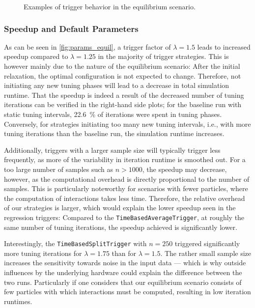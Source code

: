 \begin{figure}[htpb]
\begin{subfigure}[t]{0.5\textwidth}
		\vspace*{-1cm}
	\end{subfigure}
	\caption{Examples of trigger behavior in the equilibrium scenario.}
	\label{fig:equilibrium_trigger_behavior}
\end{figure}



\subsubsection{Speedup and Default Parameters}

As can be seen in \autoref{fig:params_equil}, a trigger factor of $\lambda=1.5$ leads to increased speedup compared to $\lambda=1.25$ in the majority of trigger strategies. This is however mainly due to the nature of the equilibrium scenario: After the initial relaxation, the optimal configuration is not expected to change.
Therefore, not initiating any new tuning phases will lead to a decrease in total simulation runtime. That the speedup is indeed  a result of the decreased number of tuning iterations can be verified in the right-hand side plots; for the baseline run with static tuning intervals, \qty{22.6}{\percent} of iterations were spent in tuning phases.
Conversely, for strategies initiating too many new tuning intervals, i.e., with more tuning iterations than the baseline run, the simulation runtime increases.

Additionally, triggers with a larger sample size will typically trigger less frequently, as more of the variability in iteration runtime is smoothed out. For a too large number of samples such as $n>1000$, the speedup may decrease, however, as the computational overhead is directly proportional to the number of samples. This is particularly noteworthy for scenarios with fewer particles, where the computation of interactions takes less time. Therefore, the relative overhead of our strategies is larger, which would explain the lower speedup seen in the regression triggers: Compared to the \texttt{TimeBasedAverageTrigger}, at roughly the same number of tuning iterations, the speedup achieved is significantly lower.

Interestingly, the \texttt{TimeBasedSplitTrigger} with $n=250$ triggered significantly more tuning iterations for $\lambda=1.75$ than for $\lambda=1.5$.  The rather small sample size increases the sensitivity towards noise in the input data --- which is why outside influences by the underlying hardware could explain the difference between the two runs. Particularly if one considers that our equilibrium scenario consists of few particles with which interactions must be computed, resulting in low iteration runtimes.


